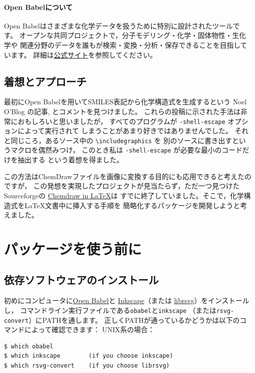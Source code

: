 \documentclass[12pt]{ltjsarticle}
\begin{document}
\paragraph{Open Babelについて}

Open Babelはさまざまな化学データを扱うために特別に設計されたツールです。
オープンな共同プロジェクトで，分子モデリング・化学・固体物性・生化学や
関連分野のデータを誰もが検索・変換・分析・保存できることを目指しています。
詳細は\href{http://openbabel.org/}{公式サイト}を参照してください。

\clearpage

\subsection{着想とアプローチ}


最初にOpen Babelを用いてSMILES表記から化学構造式を生成するという
Noel O'Blog の記事\cite{NOB1}, \cite{NOB2}とコメント\cite{JLA}を見つけました。
これらの投稿に示された手法は非常におもしろいと思いましたが，
すべてのプログラムが \verb|-shell-escape| オプションによって実行されて
しまうことがあまり好きではありませんでした。
それと同じころ，あるソース中の \verb|\includegraphics| を
別のソースに書き出すというマクロ\cite{OKU}を偶然みつけ，
このとき私は \verb|-shell-escape| が必要な最小のコードだけを抽出する
という着想を得ました。

この方法はChemDrawファイルを画像に変換する目的にも応用できると考えたのですが，
この発想を実現したプロジェクトが見当たらず，ただ一つ見つけたSourceforgeの
\href{http://chemdrawinlatex.sourceforge.net/}{Chemdraw in \LaTeX}は
すでに終了していました。そこで，化学構造式を\LaTeX 文書中に挿入する手順を
簡略化するパッケージを開発しようと考えました。

\clearpage

\section{パッケージを使う前に}

\subsection{依存ソフトウェアのインストール}

初めにコンピュータに\href{http://openbabel.org/}{Open Babel}と
\href{https://inkscape.org/ja/}{Inkscape}（または
\href{http://librsvg.sourceforge.net/download/}{librsvg}）をインストールし，
コマンドライン実行ファイルである\verb+obabel+と\verb+inkscape+
（または\verb+rsvg-convert+）にPATHを通します。
正しくPATHが通っているかどうかは以下のコマンドによって確認できます：
UNIX系の場合：
\begin{verbatim}
$ which obabel
$ which inkscape        (if you choose inkscape)
$ which rsvg-convert    (if you choose librsvg)
\end{verbatim}
\end{document}
